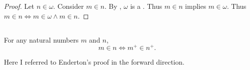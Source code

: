 \documentclass{report}
\begin{document}
  \begin{proof}
    Let $n \in \omega$.
    Consider $m \in n$.
    By , $\omega$ is a .
    Thus $m \in n$ implies $m \in \omega$.
    Thus $m \in n \iff m \in \omega \land m \in n$.
  \end{proof}

\subsection{}%

  \begin{lemma}[4L(a)]
    For any natural numbers $m$ and $n$, $$m \in n \iff m^+ \in n^+.$$
  \end{lemma}


  \begin{note}
    Here I referred to Enderton's proof in the forward direction.
  \end{note}
\end{document}

